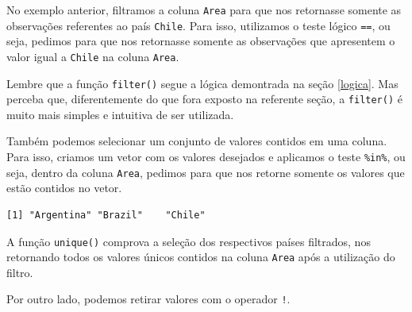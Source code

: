 \documentclass[
  brazilian,
]{book}
\newenvironment{Shaded}{\begin{snugshade}}{\end{snugshade}}
\newcommand{\FunctionTok}[1]{\textcolor[rgb]{0.00,0.00,0.00}{#1}}
\newcommand{\NormalTok}[1]{#1}
\newcommand{\OtherTok}[1]{\textcolor[rgb]{0.56,0.35,0.01}{#1}}
\newcommand{\SpecialCharTok}[1]{\textcolor[rgb]{0.00,0.00,0.00}{#1}}
\newcommand{\StringTok}[1]{\textcolor[rgb]{0.31,0.60,0.02}{#1}}
\begin{document}
No exemplo anterior, filtramos a coluna \texttt{Area} para que nos retornasse somente as observações referentes ao país \texttt{Chile}. Para isso, utilizamos o teste lógico \texttt{==}, ou seja, pedimos para que nos retornasse somente as observações que apresentem o valor igual a \texttt{Chile} na coluna \texttt{Area}.

Lembre que a função \texttt{filter()} segue a lógica demontrada na seção \ref{logica}. Mas perceba que, diferentemente do que fora exposto na referente seção, a \texttt{filter()} é muito mais simples e intuitiva de ser utilizada.

Também podemos selecionar um conjunto de valores contidos em uma coluna. Para isso, criamos um vetor com os valores desejados e aplicamos o teste \texttt{\%in\%}, ou seja, dentro da coluna \texttt{Area}, pedimos para que nos retorne somente os valores que estão contidos no vetor.

\begin{Shaded}
\end{Shaded}

\begin{verbatim}
[1] "Argentina" "Brazil"    "Chile"    
\end{verbatim}

A função \texttt{unique()} comprova a seleção dos respectivos países filtrados, nos retornando todos os valores únicos contidos na coluna \texttt{Area} após a utilização do filtro.

Por outro lado, podemos retirar valores com o operador \texttt{!}.

\begin{Shaded}
\end{Shaded}
\end{document}
